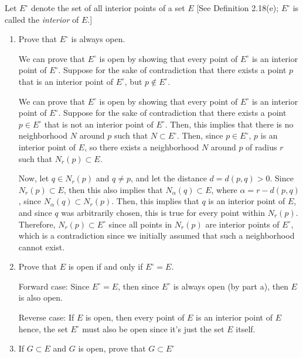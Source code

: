 \documentclass[10pt]{article}
\begin{document}
	\begin{problem}
		Let \( E^{\circ} \) denote the set of all interior points of a set \( E \) [See Definition 
		2.18(e); \( E^{\circ} \) is called the \textit{interior} of \( E \).]
		\begin{enumerate}[label=\alph*)]
			\item Prove that \( E^{\circ} \) is always open. 

				\begin{solution}
					We can prove that \( E^{\circ} \) is open by showing that every point of \( E^{\circ} \) 
					is an interior point of \( E^{\circ} \). Suppose for the sake of contradiction that 
					there exists a point \( p \) that is an interior point of \( E^{\circ} \), but 
					\( p \not \in E^{\circ} \).  

					We can prove that \( E^{\circ} \) is open by showing that every point of \( E^{\circ} \) is an 
					interior point of \( E^{\circ} \). Suppose for the sake of contradiction that there exists 
					a point \( p \in E^{\circ}\) that is not an interior point of \( E^{\circ} \). Then, this 
					implies that there is no neighborhood \( N \) around \( p \) such that \( N \subset E^{\circ} \). 
					Then, since \( p \in E^{\circ} \), \( p \) is an interior point of \( E \), so there 
					exists a neighborhood \( N \) around \( p \) of radius \( r \) such that \( N_r(p) \subset E \). 

					Now, let \( q \in N_r(p) \) and \( q \neq p \), and let the distance \( d = d(p, q) > 0\). Since 
					\( N_r(p) \subset E \), then this also implies that \( N_\alpha(q) \subset E \), 
					where \( \alpha = r - d(p, q) \), since \( N_\alpha(q) \subset N_r(p) \). Then, this 
					implies that \( q  \) is an interior point of \( E \), and since \( q \) was 
					arbitrarily chosen, this is true for every point within \( N_r(p) \). Therefore, 
					\( N_r(p) \subset E^{\circ} \) since all points 
					in \( N_r(p) \) are interior points of \( E^{\circ} \), which is a contradiction since we initially 
					assumed that such a neighborhood cannot exist. 
				\end{solution}
			\item Prove that \( E \) is open if and only if \( E^{\circ} = E \). 

				\begin{solution}
					Forward case: Since \( E^{\circ} = E \), then since \( E^{\circ} \) is always open (by part a), then
					\( E \) is also open. 

					Reverse case: If \( E \) is open, then every point of \( E \) is an interior point of \( E \) 
					hence, the set \( E^{\circ} \) must also be open since it's just the set \( E \) itself.  
				\end{solution}
			\item If \( G \subset E \) and \( G \) is open, prove that \( G\subset E^{\circ} \) 


\end{enumerate}
\end{problem}
\end{document}
